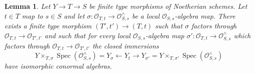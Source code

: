 \documentclass[10pt,a4paper]{amsart}
\theoremstyle{plain}
\newtheorem{lemma}[subsection]{Lemma}
\theoremstyle{definition}
\theoremstyle{remark}
\numberwithin{equation}{subsection}
\def\Spec{\mathop{\mathrm{Spec}}}
\begin{document}
\begin{lemma}
\label{lemma-control-graded}
Let $Y \to T \to S$ be finite type morphisms of Noetherian schemes.
Let $t \in T$ map to $s \in S$ and let
$\sigma : \mathcal{O}_{T, t} \to \mathcal{O}_{S, s}^\wedge$
be a local $\mathcal{O}_{S, s}$-algebra map.
There exists a finite type morphism $(T', t') \to (T, t)$
such that $\sigma$ factors through
$\mathcal{O}_{T, t} \to \mathcal{O}_{T', t'}$
and such that for every local $\mathcal{O}_{S, s}$-algebra map
$\sigma' : \mathcal{O}_{T, t} \to \mathcal{O}_{S, s}^\wedge$
which factors through $\mathcal{O}_{T, t} \to \mathcal{O}_{T', t'}$
the closed immersions
$$
Y \times_{T, \sigma} \Spec(\mathcal{O}_{S, s}^\wedge) = Y_\sigma
\longleftarrow Y_t \longrightarrow
Y_{\sigma'} =
Y \times_{T, \sigma'} \Spec(\mathcal{O}_{S, s}^\wedge)
$$
have isomorphic conormal algebras.
\end{lemma}
\end{document}
